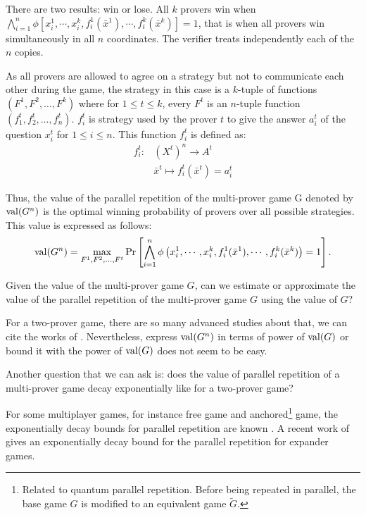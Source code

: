 There are two results: win or lose. All $k$ provers win when $ \bigwedge\limits_{i=1}^n \phi [x_i^1, \cdots , x_i^k, f_i^1(\bar{x}^1), \cdots ,  f_i^k(\bar{x}^k)]=1$, that is when all provers win simultaneously in all $n$ coordinates. The verifier treats independently each of the $n$ copies. 

As  all provers are allowed to agree on a strategy but not to communicate each other during the game, the strategy in this case is a $k$-tuple of functions $(F^1,F^2, \ldots, F^k)$ where for $1\leq t \leq k$, every $F^t$ is an $n$-tuple function $(f_1^t, f_2^t, \ldots, f_n^t)$. $f_i^t$ is strategy used by the prover $t$ to give the answer $a_i^t$ of the question $x_i^t$ for $1\leq i \leq n$. This function $f_i^t$ is defined as:
\begin{align*}
f_i^t: & (X^t)^n \longrightarrow A^t \\ & \bar{x}^t \longmapsto f_i^t(\bar{x}^t)=a_i^t
\end{align*}

Thus, the value of the parallel repetition of the multi-prover game G denoted by $\mathrm{val}(G^n)$ is the optimal winning probability of provers over all possible strategies. This value is expressed as follows: 
$$ \mathrm{val} (G^n)= \max_{F^1,F^2, \ldots, F^t} \Pr \left[  \bigwedge\limits_{i=1}^n \phi \left( x_i^1, \cdots , x_i^k, f_i^1(\bar{x}^1), \cdots ,  f_i^k(\bar{x}^k) \right)=1 \right].$$


Given the value of the multi-prover game $G$, can we estimate or approximate the value of the parallel repetition of the multi-prover game $G$ using the value of $G$? 

For a two-prover game, there are so many advanced studies about that, we can cite the works of \cite{feige1992two, verbitsky1996towards,raz1998parallel, holenstein2007parallel, barak2009strong,raz2010parallel, rao2011parallel,dinur2014analytical}.  Nevertheless, express $\mathrm{val} (G^n)$  in terms of power of $\mathrm{val} (G)$ or bound it with the power of $\mathrm{val} (G)$ does not seem to be easy.

 Another question that we can ask is: does the value of parallel repetition of a multi-prover game decay exponentially like for a two-prover game?

For some multiplayer games, for instance free game and anchored\footnote{ Related to quantum parallel repetition. Before being repeated in parallel, the base game $G$ is modified to an equivalent game $\tilde{G}$.} game, the exponentially decay bounds for parallel repetition are known \citep{barak2009strong,bavarian2015anchoring}.  A recent work of \cite{dinur2016multiplayer} gives an exponentially decay bound for the parallel repetition for  expander games. 

